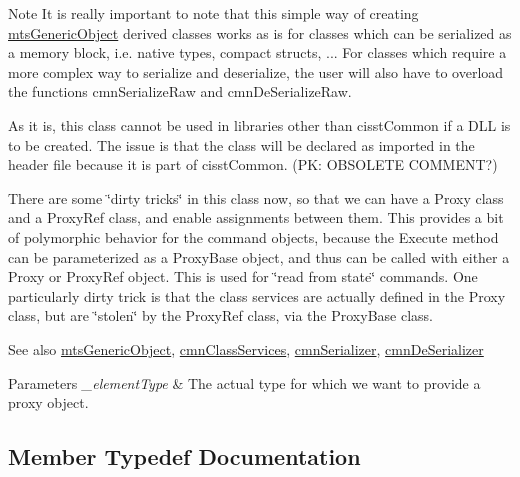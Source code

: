 \begin{DoxyNote}{Note}
It is really important to note that this simple way of creating \hyperlink{classmts_generic_object}{mts\+Generic\+Object} derived classes works as is for classes which can be serialized as a memory block, i.\+e. native types, compact structs, ... For classes which require a more complex way to serialize and deserialize, the user will also have to overload the functions cmn\+Serialize\+Raw and cmn\+De\+Serialize\+Raw.

As it is, this class cannot be used in libraries other than cisst\+Common if a D\+L\+L is to be created. The issue is that the class will be declared as imported in the header file because it is part of cisst\+Common. (P\+K\+: O\+B\+S\+O\+L\+E\+T\+E C\+O\+M\+M\+E\+N\+T?)

There are some \char`\"{}dirty tricks\char`\"{} in this class now, so that we can have a Proxy class and a Proxy\+Ref class, and enable assignments between them. This provides a bit of polymorphic behavior for the command objects, because the Execute method can be parameterized as a Proxy\+Base object, and thus can be called with either a Proxy or Proxy\+Ref object. This is used for \char`\"{}read from state\char`\"{} commands. One particularly dirty trick is that the class services are actually defined in the Proxy class, but are \char`\"{}stolen\char`\"{} by the Proxy\+Ref class, via the Proxy\+Base class.
\end{DoxyNote}
\begin{DoxySeeAlso}{See also}
\hyperlink{classmts_generic_object}{mts\+Generic\+Object}, \hyperlink{classcmn_class_services}{cmn\+Class\+Services}, \hyperlink{classcmn_serializer}{cmn\+Serializer}, \hyperlink{classcmn_de_serializer}{cmn\+De\+Serializer}
\end{DoxySeeAlso}

\begin{DoxyParams}{Parameters}
{\em \+\_\+element\+Type} & The actual type for which we want to provide a proxy object. \\
\hline
\end{DoxyParams}


\subsection{Member Typedef Documentation}
\hypertarget{classmts_generic_object_proxy_base_a61a6c330998d8ba0923ff57f0a30b81e}{}
